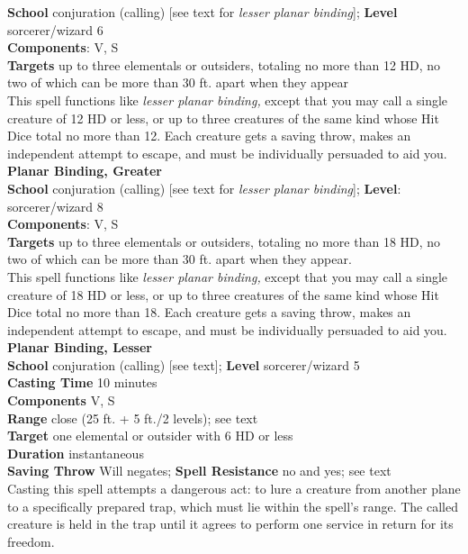 \textbf{School} conjuration (calling) [see text for \textit{lesser planar binding}]; \textbf{Level} sorcerer/wizard 6\\
\textbf{Components}: V, S\\
\textbf{Targets} up to three elementals or outsiders, totaling no more than 12 HD, no two of which can be more than 30 ft. apart when they appear\\
This spell functions like \textit{lesser planar binding, }except that you may call a single creature of 12 HD or less, or up to three creatures of the same kind whose Hit Dice total no more than 12. Each creature gets a saving throw, makes an independent attempt to escape, and must be individually persuaded to aid you.\\
\textbf{Planar Binding, Greater}\\
\textbf{School} conjuration (calling) [see text for \textit{lesser planar binding}]; \textbf{Level}: sorcerer/wizard 8\\
\textbf{Components}: V, S\\
\textbf{Targets} up to three elementals or outsiders, totaling no more than 18 HD, no two of which can be more than 30 ft. apart when they appear.\\
This spell functions like \textit{lesser planar binding, }except that you may call a single creature of 18 HD or less, or up to three creatures of the same kind whose Hit Dice total no more than 18. Each creature gets a saving throw, makes an independent attempt to escape, and must be individually persuaded to aid you.\\
\textbf{Planar Binding, Lesser}\\
\textbf{School} conjuration (calling) [see text]; \textbf{Level} sorcerer/wizard 5\\
\textbf{Casting Time} 10 minutes\\
\textbf{Components} V, S\\
\textbf{Range} close (25 ft. + 5 ft./2 levels); see text\\
\textbf{Target} one elemental or outsider with 6 HD or less\\
\textbf{Duration} instantaneous\\
\textbf{Saving Throw }Will negates; \textbf{Spell Resistance} no and yes; see text\\
Casting this spell attempts a dangerous act: to lure a creature from another plane to a specifically prepared trap, which must lie within the spell's range. The called creature is held in the trap until it agrees to perform one service in return for its freedom.\\
